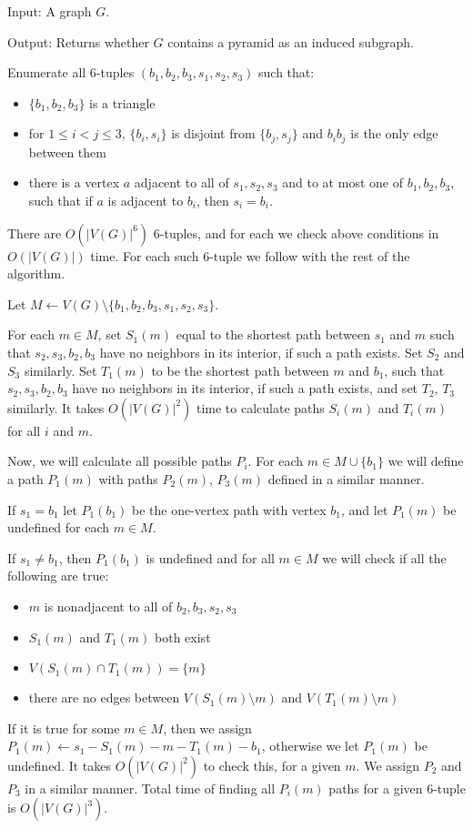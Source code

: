 \begin{alg}
	\label{alg:testPyramid}
	Input: A graph $G$.

	\noindent Output: Returns whether $G$ contains a pyramid as an induced subgraph.
\end{alg}
\begin{algtext}
	
Enumerate all 6-tuples $(b_1, b_2, b_3, s_1, s_2, s_3)$ such that:
\begin{itemize}
	\item $\{b_1, b_2, b_3\}$ is a triangle
	\item for $1 \leq i < j \leq 3$, $\{b_i, s_i\}$ is disjoint from $\{b_j, s_j\}$ and $b_ib_j$ is the only edge between them
	\item there is a vertex $a$ adjacent to all of $s_1, s_2, s_3$ and to at most one of $b_1, b_2, b_3$, such that if $a$ is adjacent to $b_i$, then $s_i = b_i$.
\end{itemize}

There are $O(|V(G)|^6)$ 6-tuples, and for each we check above conditions in $O(|V(G)|)$ time. For each such 6-tuple we follow with the rest of the algorithm.

Let $M \leftarrow V(G) \setminus \{b_1, b_2, b_3, s_1, s_2, s_3\}$.

For each $m \in M$, set $S_1(m)$ equal to the shortest path between $s_1$ and $m$ such that $s_2, s_3, b_2, b_3$ have no neighbors in its interior, if such a path exists. Set $S_2$ and $S_3$ similarly. Set $T_1(m)$ to be the shortest path between $m$ and $b_1$, such that $s_2, s_3, b_2, b_3$ have no neighbors in its interior, if such a path exists, and set $T_2$, $T_3$ similarly. It takes $O(|V(G)|^2)$ time to calculate paths $S_i(m)$ and $T_i(m)$ for all $i$ and $m$.

Now, we will calculate all possible paths $P_i$. For each $m \in M \cup \{b_1\}$ we will define a path $P_1(m)$ with paths $P_2(m)$, $P_3(m)$ defined in a similar manner.

If $s_1 = b_1$ let $P_1(b_1)$ be the one-vertex path with vertex $b_1$, and let $P_1(m)$ be undefined for each $m \in M$.

If $s_1 \neq b_1$, then $P_1(b_1)$ is undefined and for all $m \in M$ we will check if all the following are true:
\begin{itemize}
	\item $m$ is nonadjacent to all of $b_2, b_3, s_2, s_3$
	\item $S_1(m)$ and $T_1(m)$ both exist
	\item $V(S_1(m) \cap T_1(m)) = \{m\}$
	\item there are no edges between $V(S_1(m) \setminus m)$ and $V(T_1(m) \setminus m)$
\end{itemize}
If it is true for some $m \in M$, then we assign $P_1(m) \leftarrow s_1-S_1(m)-m-T_1(m)-b_1$, otherwise we let $P_1(m)$ be undefined. It takes $O(|V(G)|^2)$ to check this, for a given $m$. We assign $P_2$ and $P_3$ in a similar manner. Total time of finding all $P_i(m)$ paths for a given 6-tuple is $O(|V(G)|^3)$.


\end{algtext}
